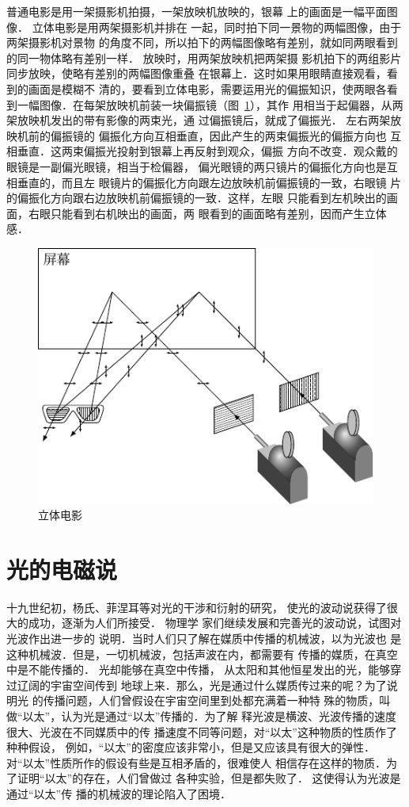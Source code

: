 普通电影是用一架摄影机拍摄，一架放映机放映的，银幕
上的画面是一幅平面图像．
立体电影是用两架摄影机并排在
一起，同时拍下同一景物的两幅图像，由于两架摄影机对景物
的角度不同，所以拍下的两幅图像略有差别，就如同两眼看到
的同一物体略有差别一样．
放映时，用两架放映机把两架摄
影机拍下的两组影片同步放映，使略有差别的两幅图像重叠
在银幕上．这时如果用眼睛直接观看，看到的画面是模糊不
清的，要看到立体电影，需要运用光的偏振知识，使两眼各看
到一幅图像．在每架放映机前装一块偏振镜（图~\ref{fig_C_6-15}），其作
用相当于起偏器，从两架放映机发出的带有影像的两束光，通
过偏振镜后，就成了偏振光．
左右两架放映机前的偏振镜的
偏振化方向互相垂直，因此产生的两束偏振光的偏振方向也
互相垂直．这两束偏振光投射到银幕上再反射到观众，偏振
方向不改变．观众戴的眼镜是一副偏光眼镜，相当于检偏器，
偏光眼镜的两只镜片的偏振化方向也是互相垂直的，而且左
眼镜片的偏振化方向跟左边放映机前偏振镜的一致，右眼镜
片的偏振化方向跟右边放映机前偏振镜的一致．这样，左眼
只能看到左机映出的画面，右眼只能看到右机映出的画面，两
眼看到的画面略有差别，因而产生立体感．
\begin{figure}[htbp]
    \centering
    \includegraphics{fig/C/6-15.pdf}
    \caption{立体电影}\label{fig_C_6-15}
\end{figure}

\section{光的电磁说}
十九世纪初，杨氏、菲涅耳等对光的干涉和衍射的研究，
使光的波动说获得了很大的成功，逐渐为人们所接受．
物理学
家们继续发展和完善光的波动说，试图对光波作出进一步的
说明．当时人们只了解在媒质中传播的机械波，以为光波也
是这种机械波．但是，一切机械波，包括声波在内，都需要有
传播的媒质，在真空中是不能传播的．
光却能够在真空中传播，
从太阳和其他恒星发出的光，能够穿过辽阔的宇宙空间传到
地球上来．那么，光是通过什么媒质传过来的呢？为了说明光
的传播问题，人们曾假设在宇宙空间里到处都充满着一种特
殊的物质，叫做“以太”，认为光是通过“以太”传播的．为了解
释光波是横波、光波传播的速度很大、光波在不同媒质中的传
播速度不同等问题，对“以太”这种物质的性质作了种种假设，
例如，“以太”的密度应该非常小，但是又应该具有很大的弹性．
对“以太”性质所作的假设有些是互相矛盾的，很难使人
相信存在这样的物质．为了证明“以太”的存在，人们曾做过
各种实验，但是都失败了．
这使得认为光波是通过“以太”传
播的机械波的理论陷入了困境．

